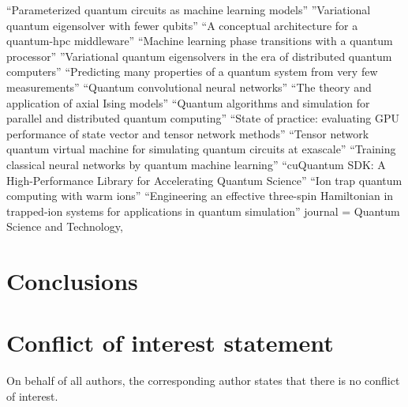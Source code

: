 \documentclass[]{article}
\begin{document}
\cite{Benedetti_2019}
``Parameterized quantum circuits as machine learning models''
\cite{PhysRevResearch.1.023025}
''Variational quantum eigensolver with fewer qubits''
\cite{saurabh2023conceptual}
``A conceptual architecture for a quantum-hpc middleware''
\cite{uvarov2020machine}
``Machine learning phase transitions with a quantum processor''
\cite{khait2023variational}
''Variational quantum eigensolvers in the era of distributed quantum computers''
\cite{huang2020predicting}
``Predicting many properties of a quantum system from very few measurements''
\cite{cong2019quantum}
``Quantum convolutional neural networks''
\cite{yeomans1988theory}
``The theory and application of axial Ising models''
\cite{parekh2021quantum}
``Quantum algorithms and simulation for parallel and distributed quantum computing''
\cite{vallero2024state}
``State of practice: evaluating GPU performance of state vector and tensor network methods''
\cite{nguyen2022tensor}
``Tensor network quantum virtual machine for simulating quantum circuits at exascale''
\cite{liu2024training}
``Training classical neural networks by quantum machine learning''
\cite{10313722}
``cuQuantum SDK: A High-Performance Library for Accelerating Quantum Science''
\cite{milburn2000ion}
``Ion trap quantum computing with warm ions''
\cite{Andrade_2022}
``Engineering an effective three-spin Hamiltonian in trapped-ion systems for applications in quantum simulation''
journal = {Quantum Science and Technology},



\section{Conclusions}


\section{Conflict of interest statement }

On behalf of all authors, the corresponding author states that there is no conflict of interest.


\end{document}
